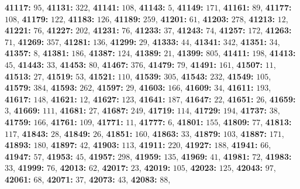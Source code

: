 \textsf{\bfseries 41117:} $95$, \textsf{\bfseries 41131:} $322$, \textsf{\bfseries 41141:} $108$, \textsf{\bfseries 41143:} $5$, \textsf{\bfseries 41149:} $171$, \textsf{\bfseries 41161:} $89$, \textsf{\bfseries 41177:} $108$, \textsf{\bfseries 41179:} $122$, \textsf{\bfseries 41183:} $126$, \textsf{\bfseries 41189:} $259$, \textsf{\bfseries 41201:} $61$, \textsf{\bfseries 41203:} $278$, \textsf{\bfseries 41213:} $12$, \textsf{\bfseries 41221:} $76$, \textsf{\bfseries 41227:} $202$, \textsf{\bfseries 41231:} $76$, \textsf{\bfseries 41233:} $37$, \textsf{\bfseries 41243:} $74$, \textsf{\bfseries 41257:} $172$, \textsf{\bfseries 41263:} $71$, \textsf{\bfseries 41269:} $357$, \textsf{\bfseries 41281:} $136$, \textsf{\bfseries 41299:} $29$, \textsf{\bfseries 41333:} $44$, \textsf{\bfseries 41341:} $342$, \textsf{\bfseries 41351:} $34$, \textsf{\bfseries 41357:} $8$, \textsf{\bfseries 41381:} $186$, \textsf{\bfseries 41387:} $124$, \textsf{\bfseries 41389:} $21$, \textsf{\bfseries 41399:} $805$, \textsf{\bfseries 41411:} $198$, \textsf{\bfseries 41413:} $45$, \textsf{\bfseries 41443:} $33$, \textsf{\bfseries 41453:} $80$, \textsf{\bfseries 41467:} $376$, \textsf{\bfseries 41479:} $79$, \textsf{\bfseries 41491:} $161$, \textsf{\bfseries 41507:} $11$, \textsf{\bfseries 41513:} $27$, \textsf{\bfseries 41519:} $53$, \textsf{\bfseries 41521:} $110$, \textsf{\bfseries 41539:} $305$, \textsf{\bfseries 41543:} $232$, \textsf{\bfseries 41549:} $105$, \textsf{\bfseries 41579:} $384$, \textsf{\bfseries 41593:} $262$, \textsf{\bfseries 41597:} $29$, \textsf{\bfseries 41603:} $166$, \textsf{\bfseries 41609:} $34$, \textsf{\bfseries 41611:} $193$, \textsf{\bfseries 41617:} $148$, \textsf{\bfseries 41621:} $12$, \textsf{\bfseries 41627:} $123$, \textsf{\bfseries 41641:} $187$, \textsf{\bfseries 41647:} $22$, \textsf{\bfseries 41651:} $26$, \textsf{\bfseries 41659:} $3$, \textsf{\bfseries 41669:} $111$, \textsf{\bfseries 41681:} $27$, \textsf{\bfseries 41687:} $249$, \textsf{\bfseries 41719:} $114$, \textsf{\bfseries 41729:} $194$, \textsf{\bfseries 41737:} $38$, \textsf{\bfseries 41759:} $166$, \textsf{\bfseries 41761:} $109$, \textsf{\bfseries 41771:} $11$, \textsf{\bfseries 41777:} $6$, \textsf{\bfseries 41801:} $155$, \textsf{\bfseries 41809:} $77$, \textsf{\bfseries 41813:} $117$, \textsf{\bfseries 41843:} $28$, \textsf{\bfseries 41849:} $26$, \textsf{\bfseries 41851:} $160$, \textsf{\bfseries 41863:} $33$, \textsf{\bfseries 41879:} $103$, \textsf{\bfseries 41887:} $171$, \textsf{\bfseries 41893:} $180$, \textsf{\bfseries 41897:} $42$, \textsf{\bfseries 41903:} $113$, \textsf{\bfseries 41911:} $220$, \textsf{\bfseries 41927:} $188$, \textsf{\bfseries 41941:} $66$, \textsf{\bfseries 41947:} $57$, \textsf{\bfseries 41953:} $45$, \textsf{\bfseries 41957:} $298$, \textsf{\bfseries 41959:} $135$, \textsf{\bfseries 41969:} $41$, \textsf{\bfseries 41981:} $72$, \textsf{\bfseries 41983:} $33$, \textsf{\bfseries 41999:} $76$, \textsf{\bfseries 42013:} $62$, \textsf{\bfseries 42017:} $23$, \textsf{\bfseries 42019:} $105$, \textsf{\bfseries 42023:} $125$, \textsf{\bfseries 42043:} $97$, \textsf{\bfseries 42061:} $68$, \textsf{\bfseries 42071:} $37$, \textsf{\bfseries 42073:} $43$, \textsf{\bfseries 42083:} $88$, 
